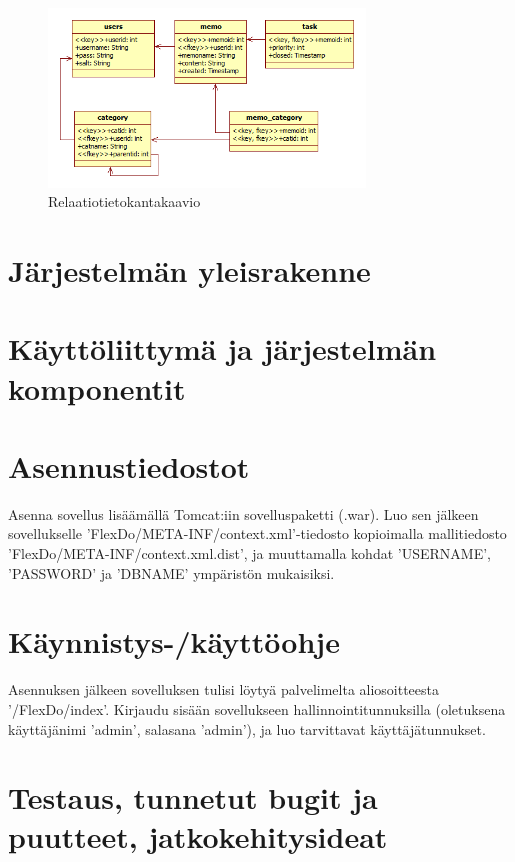 ﻿\documentclass[finnish]{report}
\begin{document}
\begin{figure}[H]
\centering
\includegraphics[width=0.75\textwidth]{relaatiotietokantakaavio}
\caption{Relaatiotietokantakaavio}
\end{figure}


\chapter{Järjestelmän yleisrakenne}



\chapter{Käyttöliittymä ja järjestelmän komponentit}



\chapter{Asennustiedostot}

Asenna sovellus lisäämällä Tomcat:iin sovelluspaketti (.war). Luo sen jälkeen sovellukselle 'FlexDo/META-INF/context.xml'-tiedosto kopioimalla mallitiedosto 'FlexDo/META-INF/context.xml.dist', ja muuttamalla kohdat 'USERNAME', 'PASSWORD' ja 'DBNAME' ympäristön mukaisiksi.


\chapter{Käynnistys-/käyttöohje}

Asennuksen jälkeen sovelluksen tulisi löytyä palvelimelta aliosoitteesta '/FlexDo/index'.
Kirjaudu sisään sovellukseen hallinnointitunnuksilla (oletuksena käyttäjänimi 'admin', salasana 'admin'), ja luo tarvittavat käyttäjätunnukset.


\chapter{Testaus, tunnetut bugit ja puutteet, jatkokehitysideat}
\end{document}
